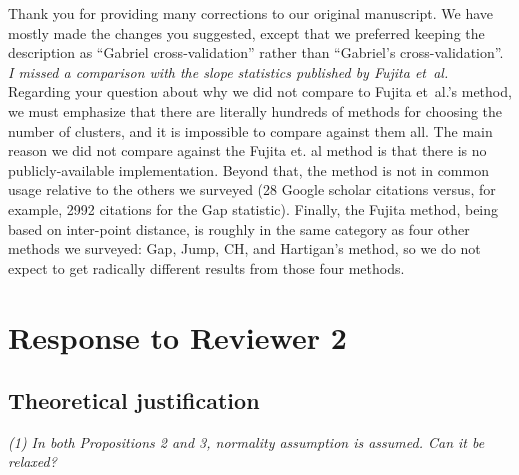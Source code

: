 \documentclass[11pt]{article}
\begin{document}
Thank you for providing many corrections to our original manuscript. We have
mostly made the changes you suggested, except that we preferred keeping the
description as ``Gabriel cross-validation'' rather than ``Gabriel's
cross-validation''.
\\

\noindent
\emph{I missed a comparison with the slope statistics published by Fujita
et~al.}
\\

Regarding your question about why we did not compare to Fujita et~al.'s
method, we must emphasize that there are literally hundreds of methods for
choosing the number of clusters, and it is impossible to compare against them
all. The main reason we did not compare against the Fujita et. al method is
that there is no publicly-available implementation. Beyond that, the method is
not in common usage relative to the others we surveyed (28 Google scholar
citations versus, for example, 2992 citations for the Gap statistic). Finally,
the Fujita method, being based on inter-point distance, is roughly in the same
category as four other methods we surveyed: Gap, Jump, CH, and Hartigan's
method, so we do not expect to get radically different results from those four
methods.


\newpage

\section{Response to Reviewer 2}

\subsection{Theoretical justification}

\emph{(1) In both Propositions 2 and 3, normality assumption is assumed.
Can it be relaxed?}
\end{document}
